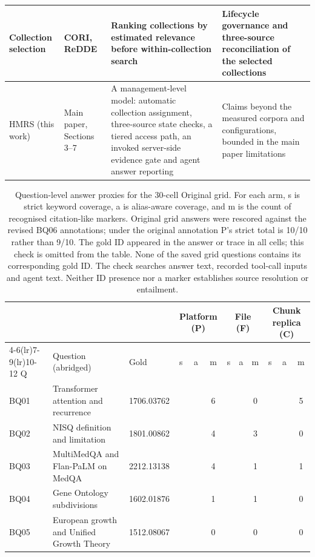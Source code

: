 \documentclass[final,5p,times,twocolumn]{elsarticle}
\newcommand{\yes}{\checkmark}\newcommand{\no}{--}
\begin{document}
\begin{table}[t]
\begin{tabular}{@{}>{\raggedright\arraybackslash}p{}>{\raggedright\arraybackslash}p{}>{\raggedright\arraybackslash}p{}>{\raggedright\arraybackslash}p{}@{}}
Collection selection & CORI, ReDDE & Ranking collections by estimated relevance before within-collection search & Lifecycle governance and three-source reconciliation of the selected collections\\
\midrule
HMRS (this work) & Main paper, Sections 3--7 & A management-level model: automatic collection assignment, three-source state checks, a tiered access path, an invoked server-side evidence gate and agent answer reporting & Claims beyond the measured corpora and configurations, bounded in the main paper limitations\\
\bottomrule
\end{tabular}
\end{table}

\begin{table}[t]
\centering
\small
\setlength{\tabcolsep}{3pt}
\caption{Question-level answer proxies for the 30-cell Original grid.
For each arm, s is strict keyword coverage, a is alias-aware coverage, and
m is the count of recognised citation-like markers. Original grid answers
were rescored against the revised BQ06 annotations; under the original
annotation P's strict total is 10/10 rather than 9/10. The gold ID appeared
in the answer or trace in all cells; this check is omitted from the table.
None of the saved grid questions contains its corresponding gold ID. The
check searches answer text, recorded tool-call inputs and agent text.
Neither ID presence nor a marker establishes source resolution or entailment.}
\label{tab:s-answer-grid}
\begin{tabular}{@{}l>{\raggedright\arraybackslash}p{}l*{9}{c}@{}}
\toprule
 & & & \multicolumn{3}{c}{Platform (P)} & \multicolumn{3}{c}{File (F)} & \multicolumn{3}{c}{Chunk replica (C)}\\
\cmidrule(lr){4-6}\cmidrule(lr){7-9}\cmidrule(lr){10-12}
Q & Question (abridged) & Gold & s & a & m & s & a & m & s & a & m\\
\midrule
BQ01 & Transformer attention and recurrence & 1706.03762 & \yes & \yes & 6 & \yes & \yes & 0 & \yes & \yes & 5\\
BQ02 & NISQ definition and limitation & 1801.00862 & \yes & \yes & 4 & \yes & \yes & 3 & \yes & \yes & 0\\
BQ03 & MultiMedQA and Flan-PaLM on MedQA & 2212.13138 & \yes & \yes & 4 & \yes & \yes & 1 & \yes & \yes & 1\\
BQ04 & Gene Ontology subdivisions & 1602.01876 & \yes & \yes & 1 & \yes & \yes & 1 & \yes & \yes & 0\\
BQ05 & European growth and Unified Growth Theory & 1512.08067 & \yes & \yes & 0 & \yes & \yes & 0 & \yes & \yes & 0\\

\end{tabular}
\end{table}
\end{document}
